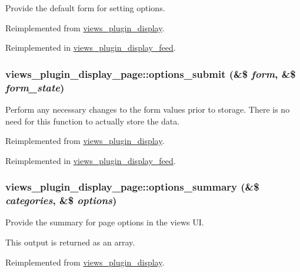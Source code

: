 Provide the default form for setting options. 

Reimplemented from \hyperlink{classviews__plugin__display_d9c69d91ea1165ff51dcd1f1f6d3a154}{views\_\-plugin\_\-display}.

Reimplemented in \hyperlink{classviews__plugin__display__feed_be0a41d577b52de992279986d6c8c2d9}{views\_\-plugin\_\-display\_\-feed}.\hypertarget{classviews__plugin__display__page_9b03d35a15fcfcae4a474ea56b6ca5b6}{
\subsubsection[{options\_\-submit}]{\setlength{\rightskip}{0pt plus 5cm}views\_\-plugin\_\-display\_\-page::options\_\-submit (\&\$ {\em form}, \/  \&\$ {\em form\_\-state})}}
\label{classviews__plugin__display__page_9b03d35a15fcfcae4a474ea56b6ca5b6}


Perform any necessary changes to the form values prior to storage. There is no need for this function to actually store the data. 

Reimplemented from \hyperlink{classviews__plugin__display_75f0b2d5587b365640fcb4d414daae36}{views\_\-plugin\_\-display}.

Reimplemented in \hyperlink{classviews__plugin__display__feed_b7cca15934456ddb26045f03483899fb}{views\_\-plugin\_\-display\_\-feed}.\hypertarget{classviews__plugin__display__page_47de087f3201600b057e0d4a55eef48c}{
\subsubsection[{options\_\-summary}]{\setlength{\rightskip}{0pt plus 5cm}views\_\-plugin\_\-display\_\-page::options\_\-summary (\&\$ {\em categories}, \/  \&\$ {\em options})}}
\label{classviews__plugin__display__page_47de087f3201600b057e0d4a55eef48c}


Provide the summary for page options in the views UI.

This output is returned as an array. 

Reimplemented from \hyperlink{classviews__plugin__display_7a2f2aeedfc14816815e3ce65a61aedf}{views\_\-plugin\_\-display}.

